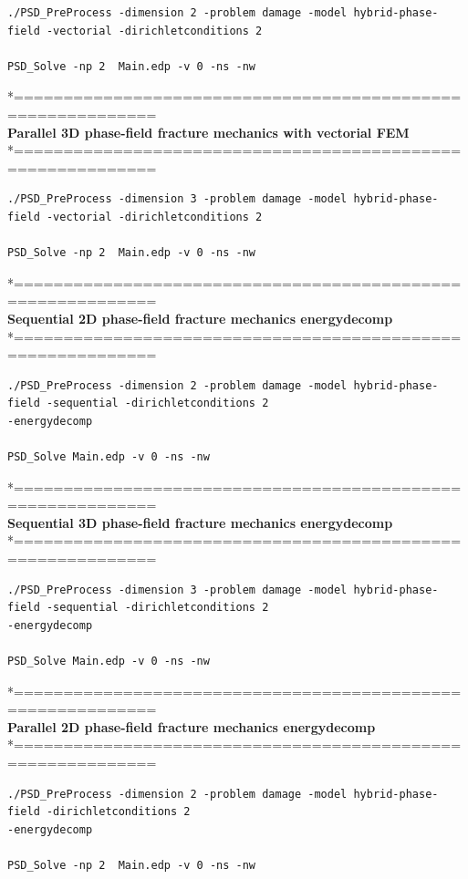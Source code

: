 \begin{lstlisting}[style=Linux]
./PSD_PreProcess -dimension 2 -problem damage -model hybrid-phase-field -vectorial -dirichletconditions 2   

PSD_Solve -np 2  Main.edp -v 0 -ns -nw   
\end{lstlisting}
*============================================================\\
\textbf{ Parallel 3D phase-field fracture mechanics  with vectorial FEM} \\
*============================================================\\
\begin{lstlisting}[style=Linux]
./PSD_PreProcess -dimension 3 -problem damage -model hybrid-phase-field -vectorial -dirichletconditions 2   

PSD_Solve -np 2  Main.edp -v 0 -ns -nw   
\end{lstlisting}
*============================================================\\
\textbf{ Sequential 2D  phase-field fracture mechanics energydecomp }\\
*============================================================\\
\begin{lstlisting}[style=Linux]
./PSD_PreProcess -dimension 2 -problem damage -model hybrid-phase-field -sequential -dirichletconditions 2 
-energydecomp   

PSD_Solve Main.edp -v 0 -ns -nw   
\end{lstlisting}
*============================================================\\
\textbf{ Sequential 3D phase-field fracture mechanics energydecomp }\\
*============================================================\\
\begin{lstlisting}[style=Linux]
./PSD_PreProcess -dimension 3 -problem damage -model hybrid-phase-field -sequential -dirichletconditions 2 
-energydecomp   

PSD_Solve Main.edp -v 0 -ns -nw   
\end{lstlisting}
*============================================================\\
\textbf{ Parallel 2D phase-field fracture mechanics energydecomp }\\
*============================================================\\
\begin{lstlisting}[style=Linux]
./PSD_PreProcess -dimension 2 -problem damage -model hybrid-phase-field -dirichletconditions 2 
-energydecomp   

PSD_Solve -np 2  Main.edp -v 0 -ns -nw   
\end{lstlisting}

